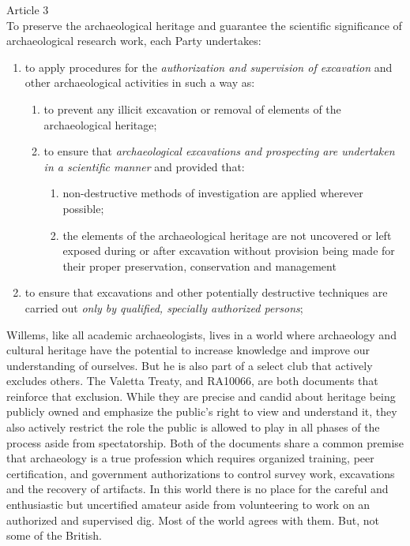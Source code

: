 \documentclass[english]{ijsra}
\begin{document}
\begin{displayquote}
	Article 3\\
	To preserve the archaeological heritage and guarantee the scientific significance of archaeological research work, each Party undertakes:
	\begin{enumerate}
		\item to apply procedures for the \textit{authorization and supervision of excavation} and other archaeological activities in such a way as:  
		\begin{enumerate}
			\item to prevent any illicit excavation or removal of elements of the archaeological heritage; 
			\item to ensure that \textit{archaeological excavations and prospecting are undertaken in a scientific manner} and provided that:
			\begin{enumerate}
				\item non-destructive methods of investigation are applied wherever possible;
				\item the elements of the archaeological heritage are not uncovered or left exposed during or after excavation without provision being made for their proper preservation, conservation and management
			\end{enumerate}
		\end{enumerate}
		\item to ensure that excavations and other potentially destructive techniques are carried out \textit{only by qualified, specially authorized persons}; \parencite{CIA_2001}
	\end{enumerate}
\end{displayquote}


Willems, like all academic archaeologists, lives in a world where archaeology and cultural heritage have the potential to increase knowledge and improve our understanding of ourselves. But he is also part of a select club that actively excludes others. The Valetta Treaty, and RA10066, are both documents that reinforce that exclusion. While they are precise and candid about heritage being publicly owned and emphasize the public’s right to view and understand it, they also actively restrict the role the public is allowed to play in all phases of the process aside from spectatorship.  Both of the documents share a common premise that archaeology is a true profession which requires organized training, peer certification, and government authorizations to control survey work, excavations and the recovery of artifacts. In this world there is no place for the careful and enthusiastic but uncertified amateur aside from volunteering to work on an authorized and supervised dig. Most of the world agrees with them. But, not some of the British.
\end{document}
